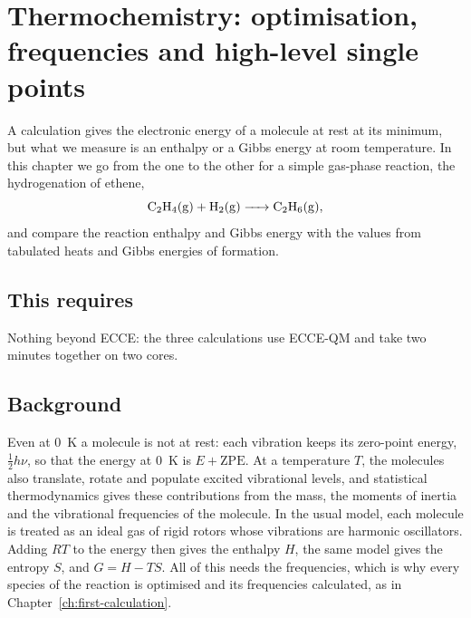 \chapter{Thermochemistry: optimisation, frequencies and high-level single points}
\label{ch:thermochemistry}

A calculation gives the electronic energy of a molecule at rest at its minimum, but what we measure is an enthalpy or a Gibbs energy at room temperature. In this chapter we go from the one to the other for a simple gas-phase reaction, the hydrogenation of ethene,
\begin{equation*}
	\ce{C2H4(g) + H2(g) -> C2H6(g)},
\end{equation*}
and compare the reaction enthalpy and Gibbs energy with the values from tabulated heats and Gibbs energies of formation.

\section*{This requires}
Nothing beyond ECCE: the three calculations use ECCE-QM and take two minutes together on two cores.

\section{Background}
Even at 0~K a molecule is not at rest: each vibration keeps its zero-point energy, $\tfrac{1}{2}h\nu$, so that the energy at 0~K is $E + \mathrm{ZPE}$. At a temperature $T$, the molecules also translate, rotate and populate excited vibrational levels, and statistical thermodynamics gives these contributions from the mass, the moments of inertia and the vibrational frequencies of the molecule. In the usual model, each molecule is treated as an ideal gas of rigid rotors whose vibrations are harmonic oscillators. Adding $RT$ to the energy then gives the enthalpy $H$, the same model gives the entropy $S$, and $G = H - TS$. All of this needs the frequencies, which is why every species of the reaction is optimised and its frequencies calculated, as in Chapter~\ref{ch:first-calculation}.

